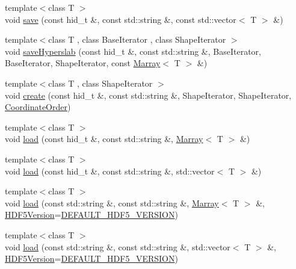 \begin{DoxyCompactItemize}
\item 
{\footnotesize template$<$class T $>$ }\\void \hyperlink{namespaceandres_1_1hdf5_a541f5c1613746f236ecc7e0035fa8919}{save} (const hid\+\_\+t \&, const std\+::string \&, const std\+::vector$<$ T $>$ \&)
\item 
{\footnotesize template$<$class T , class Base\+Iterator , class Shape\+Iterator $>$ }\\void \hyperlink{namespaceandres_1_1hdf5_a8b3c6fd3570f7452b1507bf5cf48dfc5}{save\+Hyperslab} (const hid\+\_\+t \&, const std\+::string \&, Base\+Iterator, Base\+Iterator, Shape\+Iterator, const \hyperlink{classandres_1_1Marray}{Marray}$<$ T $>$ \&)
\item 
{\footnotesize template$<$class T , class Shape\+Iterator $>$ }\\void \hyperlink{namespaceandres_1_1hdf5_ad266faeb7371428b1bf018d4ddfec60d}{create} (const hid\+\_\+t \&, const std\+::string \&, Shape\+Iterator, Shape\+Iterator, \hyperlink{namespaceandres_a2ac8b7aa89d44e8188a7c0ba50f4306b}{Coordinate\+Order})
\item 
{\footnotesize template$<$class T $>$ }\\void \hyperlink{namespaceandres_1_1hdf5_ad5975e294df6102c312f69cd69e43d60}{load} (const hid\+\_\+t \&, const std\+::string \&, \hyperlink{classandres_1_1Marray}{Marray}$<$ T $>$ \&)
\item 
{\footnotesize template$<$class T $>$ }\\void \hyperlink{namespaceandres_1_1hdf5_a2ada1d6f4dc33d14090bad2a90d4d1a6}{load} (const hid\+\_\+t \&, const std\+::string \&, std\+::vector$<$ T $>$ \&)
\item 
{\footnotesize template$<$class T $>$ }\\void \hyperlink{namespaceandres_1_1hdf5_aecef33e8f815adf3e28bb387e246ebc8}{load} (const std\+::string \&, const std\+::string \&, \hyperlink{classandres_1_1Marray}{Marray}$<$ T $>$ \&, \hyperlink{namespaceandres_1_1hdf5_ad5194a7b8773d3776e8dfc068f58f41b}{H\+D\+F5\+Version}=\hyperlink{namespaceandres_1_1hdf5_ad5194a7b8773d3776e8dfc068f58f41baf4fdc18c306e5d07105ad62a1cf6fa93}{D\+E\+F\+A\+U\+L\+T\+\_\+\+H\+D\+F5\+\_\+\+V\+E\+R\+S\+I\+O\+N})
\item 
{\footnotesize template$<$class T $>$ }\\void \hyperlink{namespaceandres_1_1hdf5_a1efbca2cf84e0a2076dd02b98a96b65b}{load} (const std\+::string \&, const std\+::string \&, std\+::vector$<$ T $>$ \&, \hyperlink{namespaceandres_1_1hdf5_ad5194a7b8773d3776e8dfc068f58f41b}{H\+D\+F5\+Version}=\hyperlink{namespaceandres_1_1hdf5_ad5194a7b8773d3776e8dfc068f58f41baf4fdc18c306e5d07105ad62a1cf6fa93}{D\+E\+F\+A\+U\+L\+T\+\_\+\+H\+D\+F5\+\_\+\+V\+E\+R\+S\+I\+O\+N})

\end{DoxyCompactItemize}

